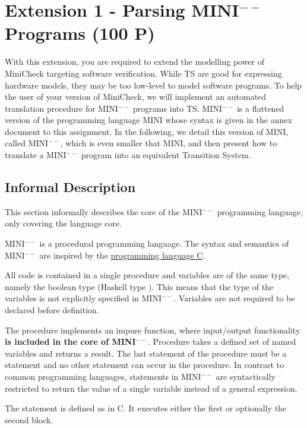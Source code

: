 \documentclass{article}
\begin{document}
\section{Extension 1 - Parsing MINI$^{--}$ Programs (100 P)}
\label{sec:ext1}
With this extension, you are required to extend the modelling power of MiniCheck targeting 
software verification. While TS are good for expressing hardware models, they may be too low-level 
to model software programs. To help the user of your version of MiniCheck, we will implement an 
automated translation procedure for MINI$^{--}$ programs into TS. MINI$^{--}$ is a flattened version of the programming language MINI whose syntax
is given in the annex document to this assignment. In the following, we detail this version of MINI, called MINI$^{--}$, which is even smaller that MINI, and then present how to translate a MINI$^{--}$ program into an equivalent Transition System.

\subsection{Informal Description}
This section informally describes the core of the MINI$^{--}$ programming language, only covering the language core.

MINI$^{--}$ is a procedural programming language. The syntax and semantics of MINI$^{--}$ are inspired by the \href{https://en.wikipedia.org/wiki/C_(programming_language)}{programming language C}.

All code is contained in a single procedure  and variables are of the same type, namely the boolean type (Haskell type ). This means that the type of the variables is not explicitly specified in MINI$^{--}$. Variables are not required to be declared before definition.

The procedure  implements an impure function, where input/output functionality \textbf{is  included in the core of MINI$^{--}$}. Procedure  takes a defined set of named variables and returns a result. The last statement of the procedure must be a  statement and no other  statement can occur in the procedure. In contrast to common programming languages,  statements in MINI$^{--}$ are syntactically restricted to return the value of a single variable instead of a general expression.

The  statement is defined as in C. It executes either the first or optionally the second block.
\end{document}
